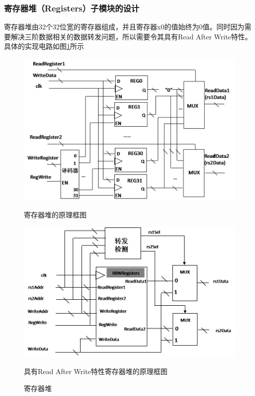 \documentclass{../source/zjureport}
\begin{document}
            \subsubsection{寄存器堆（Registers）子模块的设计}
            寄存器堆由32个32位宽的寄存器组成，并且寄存器x0的值始终为0值。同时因为需要解决三阶数据相关的数据转发问题，所以需要令其具有Read After Write特性。具体的实现电路如图\ref{寄存器堆}所示
            \begin{figure}[H]
                \centering
                \begin{minipage}[t]{0.48\textwidth}
                    \centering
                    \includegraphics[width = \textwidth]{figure/寄存器堆的原理框图.jpg}
                    \caption*{寄存器堆的原理框图}
                \end{minipage}
                \begin{minipage}[t]{0.48\textwidth}
                    \centering
                    \includegraphics[width=\textwidth]{figure/具有RAW特性寄存器堆的原理框图}
                    \caption*{具有Read After Write特性寄存器堆的原理框图}
                \end{minipage}
                \caption{寄存器堆}
                \label{寄存器堆}
            \end{figure}
\end{document}
